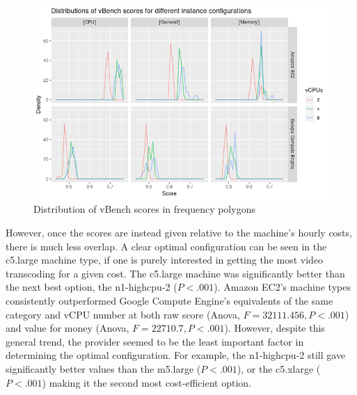 \documentclass{article}
\begin{document}
\begin{figure}
  \centering
  \includegraphics[scale=0.8]{vbench_dists}
  \caption{Distribution of vBench scores in frequency polygons}
  \label{fig:vBench-dists}
\end{figure}

However, once the scores are instead given relative to the machine's hourly costs, there is much less overlap. A clear optimal configuration can be seen in the c5.large machine type, if one is purely interested in getting the most video transcoding for a given cost. The c5.large machine was significantly better than the next best option, the n1-highcpu-2 ($P < .001$). Amazon EC2's  machine types consistently outperformed Google Compute Engine's equivalents of the same category and vCPU number at both raw score (Anova, $F = 32111.456, P < .001$) and value for money (Anova, $F = 22710.7, P < .001$). However, despite this general trend, the provider seemed to be the least important factor in determining the optimal configuration. For example, the n1-highcpu-2 still gave significantly better values than the m5.large ($P < .001$), or the c5.xlarge ($P < .001$) making it the second most cost-efficient option. 
\end{document}
